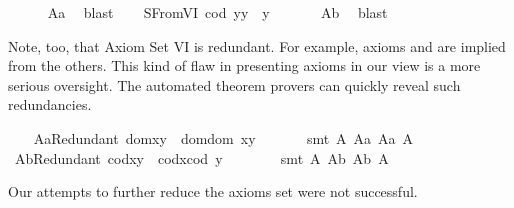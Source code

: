 \begin{isabellebody}
%
\isadelimproof
\ \ \ \ %
\endisadelimproof
%
\isatagproof
{}\isamarkupfalse%
\ A{}a\ \isamarkupfalse%
\ blast%
\endisatagproof
{\isafoldproof}%
%
\isadelimproof
\isanewline
%
\endisadelimproof
\ \ \isamarkupfalse%
\ S{}FromVI{\isacharcolon}\ {\isachardoublequoteopen}{\isacharparenleft}cod\ y{\isacharparenright}{\isasymcdot}y\ {\isasymcong}\ y{\isachardoublequoteclose}\ \isanewline
%
\isadelimproof
\ \ \ \ %
\endisadelimproof
%
\isatagproof
{}\isamarkupfalse%
\ A{}b\ \isamarkupfalse%
\ blast%
\endisatagproof
{\isafoldproof}%
%
\isadelimproof
%
\endisadelimproof
%
\begin{isamarkuptext}%
Note, too, that Axiom Set VI is redundant. For example, axioms  and  are
  implied from the others. This kind of flaw in presenting axioms in our view is a more serious oversight.
  The automated theorem provers can quickly reveal such redundancies.%
\end{isamarkuptext}\isamarkuptrue%
\ \ \isamarkupfalse%
\ A{}aRedundant{\isacharcolon}\ {\isachardoublequoteopen}dom{\isacharparenleft}x{\isasymcdot}y{\isacharparenright}\ {\isasymcong}\ dom{\isacharparenleft}{\isacharparenleft}dom\ x{\isacharparenright}{\isasymcdot}y{\isacharparenright}{\isachardoublequoteclose}\ \isanewline
%
\isadelimproof
\ \ \ \ %
\endisadelimproof
%
\isatagproof
{}\isamarkupfalse%
\ {\isacharparenleft}smt\ A{}\ A{}a\ A{}a\ A{}{\isacharparenright}%
\endisatagproof
{\isafoldproof}%
%
\isadelimproof
\ \ \isanewline
%
\endisadelimproof
\ \ \isamarkupfalse%
\ A{}bRedundant{\isacharcolon}\ {\isachardoublequoteopen}cod{\isacharparenleft}x{\isasymcdot}y{\isacharparenright}\ {\isasymcong}\ cod{\isacharparenleft}x{\isasymcdot}{\isacharparenleft}cod\ y{\isacharparenright}{\isacharparenright}{\isachardoublequoteclose}\ \ \isanewline
%
\isadelimproof
\ \ \ \ %
\endisadelimproof
%
\isatagproof
{}\isamarkupfalse%
\ {\isacharparenleft}smt\ A{}\ A{}b\ A{}b\ A{}{\isacharparenright}%
\endisatagproof
{\isafoldproof}%
%
\isadelimproof
%
\endisadelimproof
%
\begin{isamarkuptext}%
Our attempts to further reduce the axioms set   were not successful.

\end{isamarkuptext}
\end{isabellebody}
